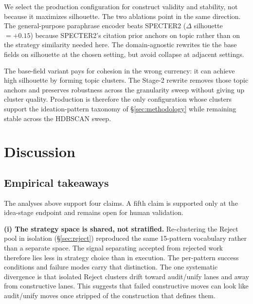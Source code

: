 \documentclass[10pt,a4paper]{article}
\begin{document}
We select the production configuration for construct validity and stability, not because it maximizes silhouette. The two ablations point in the same direction. The general-purpose paraphrase encoder beats SPECTER2 ($\Delta$ silhouette $= +0.15$) because SPECTER2's citation prior anchors on topic rather than on the strategy similarity needed here. The domain-agnostic rewrites tie the base fields on silhouette at the chosen setting, but avoid collapse at adjacent settings.

The base-field variant pays for cohesion in the wrong currency: it can achieve high silhouette by forming topic clusters. The Stage-2 rewrite removes those topic anchors and preserves robustness across the granularity sweep without giving up cluster quality. Production is therefore the only configuration whose clusters support the ideation-pattern taxonomy of \S\ref{sec:methodology} while remaining stable across the HDBSCAN sweep.

\section{Discussion}
\label{sec:discussion}

\subsection{Empirical takeaways}

The analyses above support four claims. A fifth claim is supported only at the idea-stage endpoint and remains open for human validation.

\textbf{(i) The strategy space is shared, not stratified.} Re-clustering the Reject pool in isolation (\S\ref{sec:reject}) reproduced the same 15-pattern vocabulary rather than a separate space. The signal separating accepted from rejected work therefore lies less in strategy choice than in execution. The per-pattern success conditions and failure modes carry that distinction. The one systematic divergence is that isolated Reject clusters drift toward audit/unify lanes and away from constructive lanes. This suggests that failed constructive moves can look like audit/unify moves once stripped of the construction that defines them.
\end{document}
